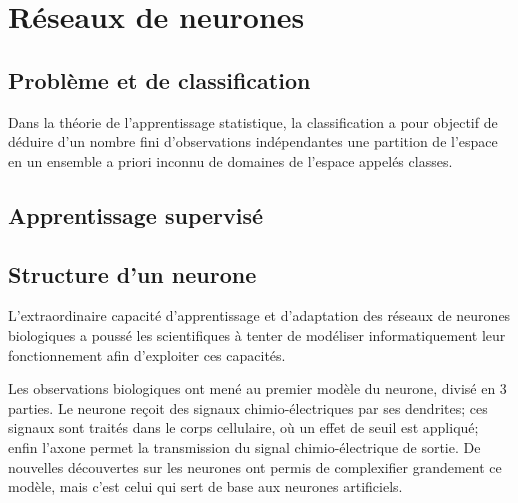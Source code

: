 \chapter{Réseaux de neurones}

\section{Problème et de classification}
Dans la théorie de l'apprentissage statistique, la classification a pour objectif de déduire d'un nombre fini d'observations indépendantes une partition de l'espace en un ensemble a priori inconnu de domaines de l'espace appelés classes. 


\section{Apprentissage supervisé}


\section{Structure d'un neurone}

L'extraordinaire capacité d'apprentissage et d'adaptation des réseaux de neurones biologiques a poussé les scientifiques à tenter de modéliser informatiquement leur fonctionnement afin d'exploiter ces capacités. 

Les observations biologiques ont mené au premier modèle du neurone, divisé en 3 parties. Le neurone reçoit des signaux chimio-électriques par ses dendrites; ces signaux sont traités dans le corps cellulaire, où un effet de seuil est appliqué; enfin l'axone permet la transmission du signal chimio-électrique de sortie. De nouvelles découvertes sur les neurones ont permis de complexifier grandement ce modèle, mais c'est celui qui sert de base aux neurones artificiels. \\


